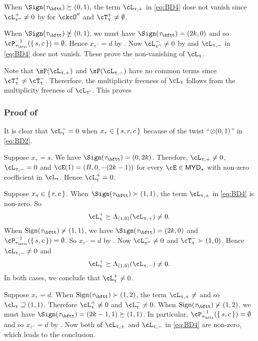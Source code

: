 \documentclass[12pt,a4paper]{amsart}
\def\MYD{{\mathsf{MYD}}}
\numberwithin{equation}{section}
\theoremstyle{remark}
\def\ssign{\mathrm{Sign}}
\def\ncL{\cL^-}
\def\uptaupp{\uptau^{\prime\prime}}
\begin{document}
When $\Sign(\tau_{\bftt})\succeq (0,1)$, the term $\ppac{\uptau}$ in \eqref{eq:BD4} dose
not vanish since $\pac{\uptaupp}\neq 0$ by  for $\ckcO''$ and $\pcT_{\uptau}\neq \emptyset$. 

When $\Sign(\tau_{\bftt})\nsucceq (0,1)$, we must have $\Sign(\tau_{\bftt}) =
(2k,0)$ and so $\cP_{\tau_{\bftt}}^{-1}(\set{s,c})=\emptyset$. Hence
$x_{\uptaupp}=d$ by . Now $\nac{\uptaupp} \neq 0$ by
 and $\nnac{\uptau}$  in \eqref{eq:BD4} dose not vanish. 
These prove the non-vanishing of $\ac_{\uptau}$.

Note that
$\sF(\ppac{\uptau})$ and $\sF(\nnac{\uptau})$ have no common terms since
$\pcT_{\uptau}\neq \ncT_{\uptau}$. Thererfore, the multiplicity freeness of
$\ac_{\uptau}$ follows from the multiplicity freeness of $\ac_{\uptau'}$.
This proves 


\subsubsection*{Proof of  }

It is clear that $\nac{\uptau}=0$ when $x_{\tau}\in \set{s,r,c}$ because of
the twist ``$\otimes(0, 1)$'' in \eqref{eq:BD2}.

  \begin{enumPF}
    \item  Suppose $x_{\uptau}=s$. We have $\Sign(\tau_{\bftt})=(0,2k)$.
    Therefore,  $\ppac{\uptau}\neq 0$, $\nnac{\uptau}=0$ and $\cE(1) =
    (B,0,-(2k-1))$ for every $\cE\in \MYD_{\star}$ with non-zero coefficient in
    $\ac_{\uptau}$. Hence $\pac{\uptau}=0$.
    \item Suppose $x_{\uptau} \in \set{r,c}$. When 
    $\Sign(\tau_{\bftt})\succ(1,1)$, the term $\ppac{\uptau}$ in \eqref{eq:BD4} is
    non-zero. 
    So 
    \[
    \pac{\uptau}\succeq \Lambda_{(1,0)} (\ppac{\uptau}) \neq 0.
    \]
    When $\ssign(\tau_{\bftt})\nsucc (1,1)$,  we have $\Sign(\tau_{\bftt})=(2k,0)$
    and $\cP_{\tau_{\bftt}}^{-1}(\set{s,c})=\emptyset$. 
    So $x_{\uptaupp}=d$ by . Now $\ncL_{\uptau''}\neq 0$  
    and $\ncT_{\uptau}\succ (1,0)$.
    Hence  $\nnac{\uptau}\neq 0$ and 
    \[
    \pac{\uptau}\succeq \Lambda_{(1,0)} (\nnac{\uptau}) \neq 0.
    \]
    In both cases, we conclude that $\pac{\uptau}\neq 0$.
    \item Suppose $x_{\uptau}=d$. When $\ssign(\tau_{\bftt})\succ (1,2)$,
    the term $\ppac{\uptau}\neq $ and so
    $\ac_{\uptau}\sqsupseteq (1,1)$. Therefore $\pac{\uptau}\neq 0$ and
    $\nac{\uptau}\neq 0$.
    When $\ssign(\tau_{\bftt})\nsucc(1,2)$, we must have  $\Sign(\tau_{\bftt}) = (2k-1,1)\succeq (1,1)$.
    In particular, $\cP_{\tau_{\bftt}}^{-1}(\set{s,c})=\emptyset$ and 
    so $x_{\uptaupp}=d$ by .
    Now both of $\ppac{\uptau}$ and $\nnac{\uptau}$ in \eqref{eq:BD4} are non-zero, which leads to the conclusion.
  \end{enumPF}
\end{document}
